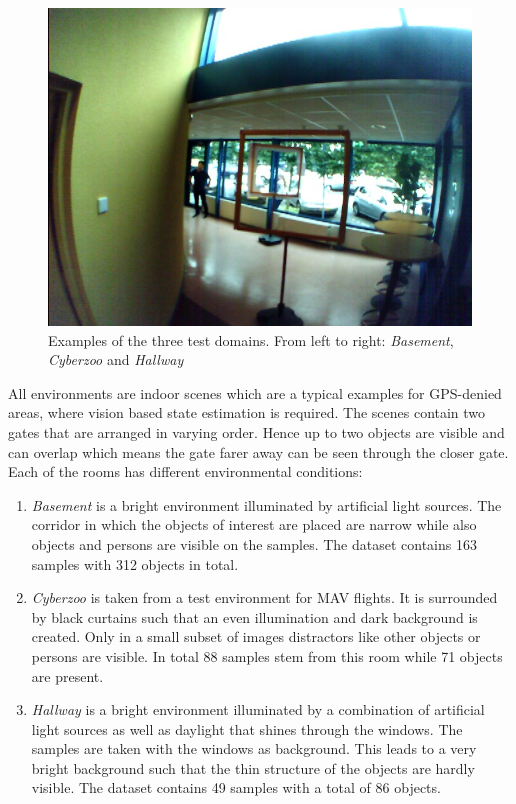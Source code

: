 \begin{figure}
\begin{minipage}{0.3\textwidth}
	\end{minipage}\hfill
	\begin{minipage}{0.3\textwidth}
		\includegraphics[width=\textwidth]{fig/hallway}
	\end{minipage}
	\caption{Examples of the three test domains. From left to right: \textit{Basement}, \textit{Cyberzoo} and \textit{Hallway}}
	\label{fig:example_real_set}
\end{figure}

All environments are indoor scenes which are a typical examples for GPS-denied areas, where vision based state estimation is required. The scenes contain two gates that are arranged in varying order. Hence up to two objects are visible and can overlap which means the gate farer away can be seen through the closer gate. Each of the rooms has different environmental conditions:
\begin{enumerate}
	\item \textit{Basement} is a bright environment illuminated by artificial light sources. The corridor in which the objects of interest are placed are narrow while also objects and persons are visible on the samples. The dataset contains 163 samples with 312 objects in total.
	\item \textit{Cyberzoo} is taken from a test environment for \ac{MAV} flights.  It is surrounded by black curtains such that an even illumination and dark background is created. Only in a small subset of images distractors like other objects or persons are visible. In total 88 samples stem from this room while 71 objects are present.
	\item \textit{Hallway} is a bright environment illuminated by a combination of artificial light sources as well as daylight that shines through the windows. The samples are taken with the windows as background. This leads to a very bright background such that the thin structure of the objects are hardly visible. The dataset contains 49 samples with a total of 86 objects.
\end{enumerate}


